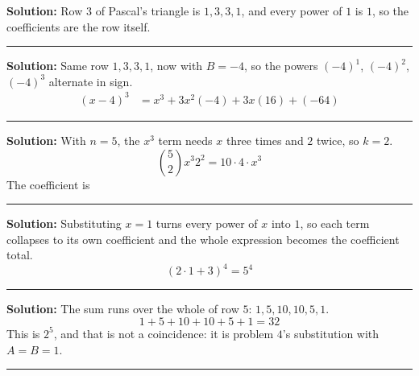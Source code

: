 \documentclass[12pt]{article}
\begin{document}




\textbf{Solution:} Row $3$ of Pascal's triangle is $1, 3, 3, 1$, and every power of $1$ is
$1$, so the coefficients are the row itself. 

\vspace{0.2cm}\noindent\rule{\linewidth}{0.2pt}


\textbf{Solution:} Same row $1, 3, 3, 1$, now with $B = -4$, so the powers $(-4)^1$,
$(-4)^2$, $(-4)^3$ alternate in sign.
\begin{align*}
  (x - 4)^3 &= x^3 + 3x^2(-4) + 3x(16) + (-64)
\end{align*}

\vspace{0.2cm}\noindent\rule{\linewidth}{0.2pt}


\textbf{Solution:} With $n = 5$, the $x^3$ term needs $x$ three times and $2$ twice, so
$k = 2$.
\[ \binom{5}{2} x^3 2^2 = 10 \cdot 4 \cdot x^3 \]
The coefficient is 

\vspace{0.2cm}\noindent\rule{\linewidth}{0.2pt}


\textbf{Solution:} Substituting $x = 1$ turns every power of $x$ into $1$, so each term
collapses to its own coefficient and the whole expression becomes the coefficient total.
\[ (2 \cdot 1 + 3)^4 = 5^4 \]

\vspace{0.2cm}\noindent\rule{\linewidth}{0.2pt}


\textbf{Solution:} The sum runs over the whole of row $5$: $1, 5, 10, 10, 5, 1$.
\[ 1 + 5 + 10 + 10 + 5 + 1 = 32 \]
This is $2^5$, and that is not a coincidence: it is problem $4$'s substitution with
$A = B = 1$.

\vspace{0.2cm}\noindent\rule{\linewidth}{0.2pt}

\end{document}
